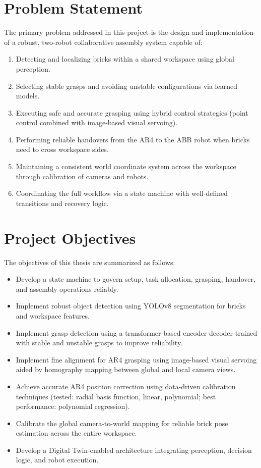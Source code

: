 \section{Problem Statement}
The primary problem addressed in this project is the design and implementation of a robust, two-robot collaborative assembly system capable of:
\begin{enumerate}
    \item Detecting and localizing bricks within a shared workspace using global perception.
    \item Selecting stable grasps and avoiding unstable configurations via learned models.
    \item Executing safe and accurate grasping using hybrid control strategies (point control combined with image-based visual servoing).
    \item Performing reliable handovers from the AR4 to the ABB robot when bricks need to cross workspace sides.
    \item Maintaining a consistent world coordinate system across the workspace through calibration of cameras and robots.
    \item Coordinating the full workflow via a state machine with well-defined transitions and recovery logic.
\end{enumerate}

\section{Project Objectives}
The objectives of this thesis are summarized as follows:
\begin{itemize}
    \item Develop a state machine to govern setup, task allocation, grasping, handover, and assembly operations reliably.
    \item Implement robust object detection using YOLOv8 segmentation for bricks and workspace features.
    \item Implement grasp detection using a transformer-based encoder-decoder trained with stable and unstable grasps to improve reliability.
    \item Implement fine alignment for AR4 grasping using image-based visual servoing aided by homography mapping between global and local camera views.
    \item Achieve accurate AR4 position correction using data-driven calibration techniques (tested: radial basis function, linear, polynomial; best performance: polynomial regression).
    \item Calibrate the global camera-to-world mapping for reliable brick pose estimation across the entire workspace.
    \item Develop a Digital Twin-enabled architecture integrating perception, decision logic, and robot execution.
\end{itemize}

